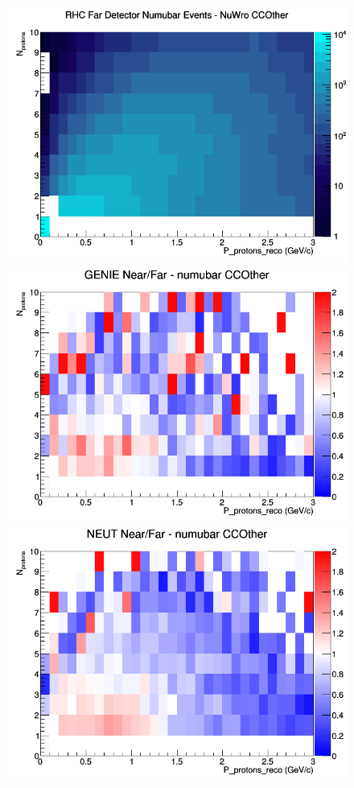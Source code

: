 \begin{figure}[h]
\endminipage
{}
\includegraphics[width=\linewidth]{eff_N_P/LAr/protons/CCOther_RHC_FD_numubar_N_P_NuWro.png}
\endminipage
\newline
{}
\includegraphics[width=\linewidth]{eff_N_P/LAr/protons/ratios/CCOther_GENIE_numubar_NF_N_P.png}
\endminipage
{}
\includegraphics[width=\linewidth]{eff_N_P/LAr/protons/ratios/CCOther_NEUT_numubar_NF_N_P.png}

\end{figure}
